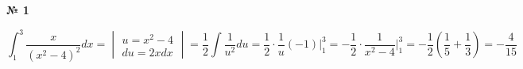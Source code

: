 \documentclass{article}
\begin{document}
\textbf{№ 1} 

$$ \int_{1}^{3} \frac{x}{(x^2-4)^2} dx 
= \begin{vmatrix} u = x^2-4 \\
                 du = 2xdx \end{vmatrix} 
= \frac{1}{2} \int \frac{1}{u^2} du
= \frac{1}{2} \cdot \frac{1}{u}(-1) \bigg\vert_{1}^{3} 
= -\frac{1}{2} \cdot \frac{1}{x^2-4} \bigg\vert_{1}^{3} 
= -\frac{1}{2} \left( \frac{1}{5} + \frac{1}{3} \right) 
= -\frac{4}{15} $$
\end{document}
